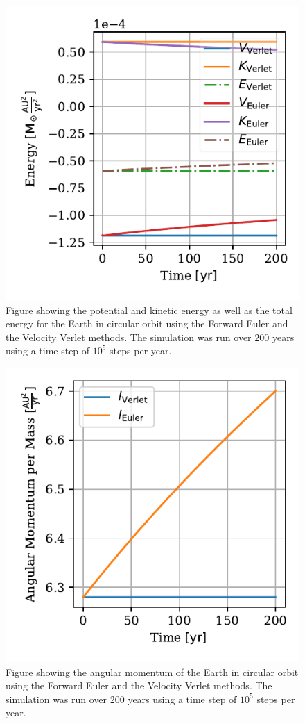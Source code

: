 \documentclass[twocolumn]{aastex62}
\begin{document}
\begin{figure}
\includegraphics[scale=1]{Figures/taskb_energies.pdf}
\caption{Figure showing the potential and kinetic energy as well as the total energy for the Earth in circular orbit using the Forward Euler and the Velocity Verlet methods. The simulation was run over $200$ years using a time step of $10^5$ steps per year.}
\label{fig:energy}
\end{figure}

\begin{figure}
\includegraphics[scale=1]{Figures/taskb_angmom.pdf}
\caption{Figure showing the angular momentum of the Earth in circular orbit using the Forward Euler and the Velocity Verlet methods. The simulation was run over $200$ years using a time step of $10^5$ steps per year.}
\label{fig:angmom}
\end{figure}
\end{document}
